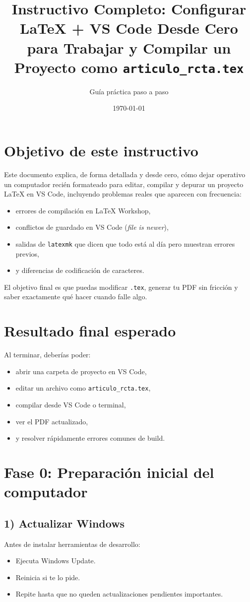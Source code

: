 \documentclass[11pt]{article}
\title{Instructivo Completo: Configurar LaTeX + VS Code Desde Cero\\
para Trabajar y Compilar un Proyecto como \texttt{articulo\_rcta.tex}}
\author{Gu\'ia pr\'actica paso a paso}
\date{\today}
\begin{document}
\maketitle
\tableofcontents
\newpage

\section{Objetivo de este instructivo}
Este documento explica, de forma detallada y desde cero, c\'omo dejar operativo un computador reci\'en formateado para editar, compilar y depurar un proyecto LaTeX en VS Code, incluyendo problemas reales que aparecen con frecuencia:

\begin{itemize}
  \item errores de compilaci\'on en LaTeX Workshop,
  \item conflictos de guardado en VS Code (\textit{file is newer}),
  \item salidas de \texttt{latexmk} que dicen que todo est\'a al d\'ia pero muestran errores previos,
  \item y diferencias de codificaci\'on de caracteres.
\end{itemize}

El objetivo final es que puedas modificar \texttt{.tex}, generar tu PDF sin fricci\'on y saber exactamente qu\'e hacer cuando falle algo.

\section{Resultado final esperado}
Al terminar, deber\'ias poder:

\begin{itemize}
  \item abrir una carpeta de proyecto en VS Code,
  \item editar un archivo como \texttt{articulo\_rcta.tex},
  \item compilar desde VS Code o terminal,
  \item ver el PDF actualizado,
  \item y resolver r\'apidamente errores comunes de build.
\end{itemize}

\section{Fase 0: Preparaci\'on inicial del computador}
\subsection{1) Actualizar Windows}
Antes de instalar herramientas de desarrollo:
\begin{itemize}
  \item Ejecuta Windows Update.
  \item Reinicia si te lo pide.
  \item Repite hasta que no queden actualizaciones pendientes importantes.
\end{itemize}
\end{document}
